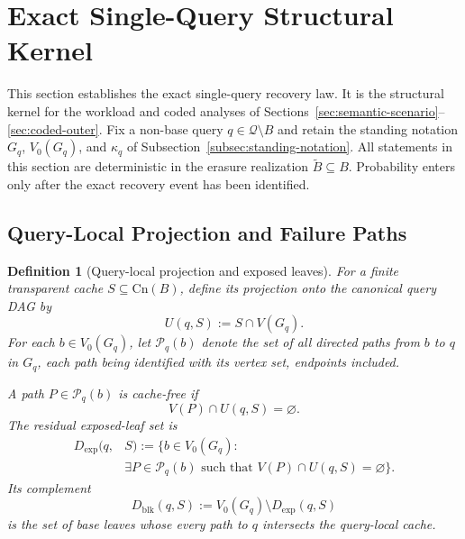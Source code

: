 \documentclass[journal]{IEEEtran}
\newcommand{\Cn}{\text{Cn}}
\newtheorem{definition}{Definition}[section]
\numberwithin{equation}{section}
\begin{document}
\section{Exact Single-Query Structural Kernel}
\label{sec:single-query-kernel}

This section establishes the exact single-query recovery law.  It is the
structural kernel for the workload and coded analyses of
Sections~\ref{sec:semantic-scenario}--\ref{sec:coded-outer}.  Fix a non-base
query \(q\in\mathcal Q\setminus B\) and retain the standing notation
\(G_q\), \(V_0(G_q)\), and \(\kappa_q\) of
Subsection~\ref{subsec:standing-notation}.
All statements in this section are deterministic in the erasure realization
\(\widetilde B\subseteq B\).  Probability enters only after the exact
recovery event has been identified.

\subsection{Query-Local Projection and Failure Paths}
\label{subsec:query-local-projection}

\begin{definition}[Query-local projection and exposed leaves]
\label{def:query-local-residual}
For a finite transparent cache \(S\subseteq\Cn(B)\), define its projection onto
the canonical query DAG by
\begin{equation}
  U(q,S):=S\cap V(G_q).
\label{eq:query-local-projection}
\end{equation}
For each \(b\in V_0(G_q)\), let \(\mathcal P_q(b)\) denote the set of all
directed paths from \(b\) to \(q\) in \(G_q\), each path being identified
with its vertex set, endpoints included.

A path \(P\in\mathcal P_q(b)\) is \emph{cache-free} if
\[
  V(P)\cap U(q,S)=\varnothing.
\]
The residual exposed-leaf set is
\begin{equation}
  \begin{split}
    D_{\mathrm{exp}}(q,&S)
    := \bigl\{ b\in V_0(G_q) :  \\
    & \exists P\in\mathcal P_q(b) \text{ such that }
      V(P)\cap U(q,S)=\varnothing \bigr\}.
  \end{split}
\label{eq:def-exposed-leaves}
\end{equation}
Its complement
\begin{equation}
  D_{\mathrm{blk}}(q,S)
  :=
  V_0(G_q)\setminus D_{\mathrm{exp}}(q,S)
\label{eq:def-blocked-leaves}
\end{equation}
is the set of base leaves whose every path to \(q\) intersects the query-local
cache.
\end{definition}
\end{document}
